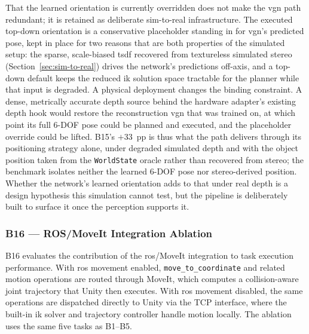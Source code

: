 That the learned orientation is currently overridden does not make the \gls{vgn} path redundant; it is retained as deliberate sim-to-real infrastructure. The executed top-down orientation is a conservative placeholder standing in for \gls{vgn}'s predicted pose, kept in place for two reasons that are both properties of the simulated setup: the sparse, scale-biased \gls{tsdf} recovered from textureless simulated stereo (Section~\ref{sec:sim-to-real}) drives the network's predictions off-axis, and a top-down default keeps the reduced \gls{ik} solution space tractable for the planner while that input is degraded. A physical deployment changes the binding constraint. A dense, metrically accurate depth source behind the hardware adapter's existing depth hook would restore the reconstruction \gls{vgn} that was trained on, at which point its full 6-DOF pose could be planned and executed, and the placeholder override could be lifted. B15's $+33$~pp is thus what the path delivers through its positioning strategy alone, under degraded simulated depth and with the object position taken from the \texttt{WorldState} oracle rather than recovered from stereo; the benchmark isolates neither the learned 6-DOF pose nor stereo-derived position. Whether the network's learned orientation adds to that under real depth is a design hypothesis this simulation cannot test, but the pipeline is deliberately built to surface it once the perception supports it.

\subsubsection{B16 — ROS/MoveIt Integration Ablation}\label{sec:results-ros}
B16 evaluates the contribution of the \gls{ros}/MoveIt integration to task execution performance. With \gls{ros} movement enabled, \texttt{move\_to\_coordinate} and related motion operations are routed through MoveIt, which computes a collision-aware joint trajectory that Unity then executes. With \gls{ros} movement disabled, the same operations are dispatched directly to Unity via the TCP interface, where the built-in \gls{ik} solver and trajectory controller handle motion locally. The ablation uses the same five tasks as B1–B5.

